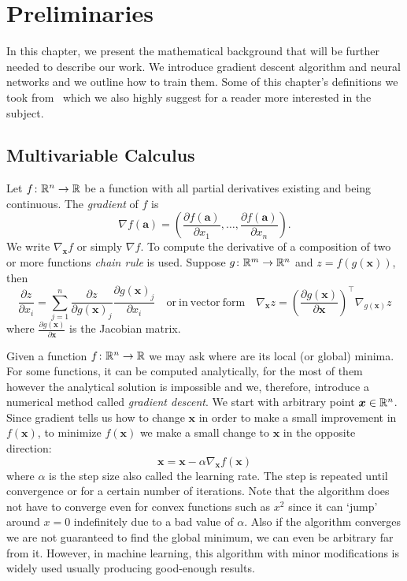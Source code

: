 \chapter{Preliminaries}\label{chap:preliminaries}


In this chapter, we present the mathematical background that will be further needed to describe our work. We introduce gradient descent algorithm and neural networks and we outline how to train them. Some of this chapter's definitions we took from~\cite{Goodfellow-et-al-2016} which we also highly suggest for a reader more interested in the subject.


\section{Multivariable Calculus}
Let $f\colon\mathbb{R}^n\to\mathbb{R}$ be a function with all partial derivatives existing and being continuous. The \textit{gradient} of $f$ is
\begin{equation*}
\nabla f(\bm{a})=\left(\frac{\partial f(\bm{a})}{\partial x_1},\dots,\frac{\partial f(\bm{a})}{\partial x_n}\right).
\end{equation*}
We write $\nabla_{\bm{x}} f$ or simply $\nabla f$.
To compute the derivative of a composition of two or more functions \textit{chain rule} is used. Suppose $g\colon\mathbb{R}^m\to\mathbb{R}^n$ and $z=f(g(\bm{x}))$, then
\begin{equation*}
\frac{\partial z}{\partial x_i}=\sum\limits_{j=1}^n\frac{\partial z}{\partial g(\bm{x})_j}\frac{\partial g(\bm{x})_j}{\partial x_i}\quad\mathrm{or\ in\ vector\ form}\quad\nabla_{\bm{x}}z=\left(\frac{\partial g(\bm{x})}{\partial\bm{x}}\right)^\top\nabla_{g(\bm{x})}z
\end{equation*}
where $\frac{\partial g(\bm{x})}{\partial\bm{x}}$ is the Jacobian matrix.

Given a function $f\colon\mathbb{R}^n\to\mathbb{R}$ we may ask where are its local (or global) minima. For some functions, it can be computed analytically, for the most of them however the analytical solution is impossible and we, therefore, introduce a numerical method called \textit{gradient descent}. We start with arbitrary point $\bm{x}\in \mathbb{R}{^n}$. Since gradient tells us how to change $\bm{x}$ in order to make a small improvement in $f(\bm{x})$, to minimize $f(\bm{x})$ we make a small change to $\bm{x}$ in the opposite direction:
\begin{equation*}
\bm{x}=\bm{x}-\alpha\nabla_{\bm{x}}f(\bm{x})
\end{equation*}
where $\alpha$ is the step size also called the learning rate. The step is repeated until convergence or for a certain number of iterations. Note that the algorithm does not have to converge even for convex functions such as $x^2$ since it can `jump' around $x=0$ indefinitely due to a bad value of $\alpha$.
Also if the algorithm converges we are not guaranteed to find the global minimum, we can even be arbitrary far from it. However, in machine learning, this algorithm with minor modifications is widely used usually producing good-enough results.

